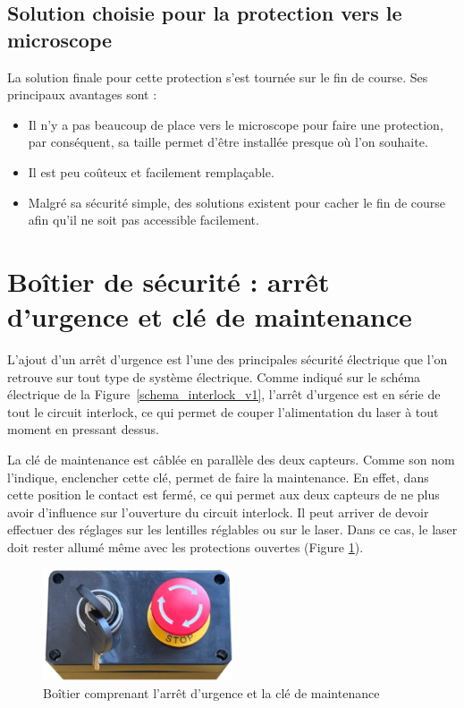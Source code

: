 \subsection{Solution choisie pour la protection vers le microscope}
La solution finale pour cette protection s'est tournée sur le fin de course. Ses principaux avantages sont  :
\begin{itemize}[label=\textbullet]
    \item Il n'y a pas beaucoup de place vers le microscope pour faire une protection, par conséquent, sa taille permet d'être installée presque où l'on souhaite.
    \item Il est peu coûteux et facilement remplaçable.
    \item Malgré sa sécurité simple, des solutions existent pour cacher le fin de course afin qu'il ne soit pas accessible facilement.
\end{itemize}

\section{Boîtier de sécurité : arrêt d'urgence et clé de maintenance}
\label{subsec:arret_urgence_maintenance}
L'ajout d'un arrêt d'urgence est l'une des principales sécurité électrique que l'on retrouve sur tout type de système électrique. Comme indiqué sur le schéma électrique de la Figure~\ref{schema_interlock_v1}, l'arrêt d'urgence est en série de tout le circuit interlock, ce qui permet de couper l'alimentation du laser à tout moment en pressant dessus.

La clé de maintenance est câblée en parallèle des deux capteurs. Comme son nom l'indique, enclencher cette clé, permet de faire la maintenance. En effet, dans cette position le contact est fermé, ce qui permet aux deux capteurs de ne plus avoir d'influence sur l'ouverture du circuit interlock. Il peut arriver de devoir effectuer des réglages sur les lentilles réglables ou sur le laser. Dans ce cas, le laser doit rester allumé même avec les protections ouvertes (Figure \ref{boitier_arret_urgence_maintenance}).

\begin{figure}[H]
    \begin{center}
        \includegraphics[width=0.5\textwidth]{assets/figures/Protections_laser/Securite_electrique/boitier_arret_urgence_maintenance.png}
    \end{center}
    \caption{Boîtier comprenant l'arrêt d'urgence et la clé de maintenance}
    \label{boitier_arret_urgence_maintenance}
\end{figure}

